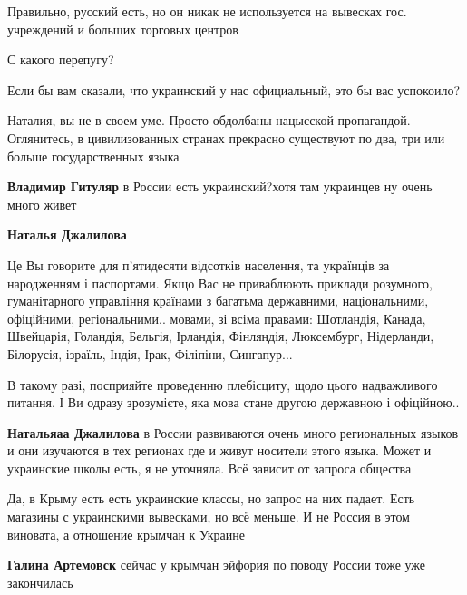 \begin{itemize}
\begin{itemize}
Правильно, русский есть, но он никак не используется на вывесках гос. учреждений и больших торговых центров

С какого перепугу?

Если бы вам сказали, что украинский у нас официальный, это бы вас успокоило?

Наталия, вы не в своем уме. Просто обдолбаны нацысской пропагандой. Оглянитесь,
в цивилизованных странах прекрасно существуют по два, три или больше
государственных языка

\textbf{Владимир Гитуляр} в России есть украинский?хотя там украинцев ну очень много живет

\textbf{Наталья Джалилова} 

Це Вы говорите для п'ятидесяти відсотків населення, та українців за народженням
і паспортами. Якщо Вас не приваблюють приклади розумного, гуманітарного
управління країнами з багатьма державними, національними, офіційними,
регіональними.. мовами, зі всіма правами: Шотландія, Канада, Швейцарія,
Голандія, Бельгія, Ірландія, Фінляндія, Люксембург, Нідерланди, Білорусія,
ізраїль, Індія, Ірак, Філіпіни, Сингапур...

В такому разі, посприяйте проведенню плебісциту, щодо цього надважливого
питання. І Ви одразу зрозумієте, яка мова стане другою державною і
офіційною..🤔

\textbf{Натальяаа Джалилова} в России развиваются очень много региональных
языков и они изучаются в тех регионах где и живут носители этого языка. Может и
украинские школы есть, я не уточняла. Всё зависит от запроса общества

Да, в Крыму есть есть украинские классы, но запрос на них падает. Есть магазины
с украинскими вывесками, но всё меньше. И не Россия в этом виновата, а
отношение крымчан к Украине

\textbf{Галина Артемовск} сейчас у крымчан эйфория по поводу России тоже уже
закончилась


\end{itemize}
\end{itemize}
